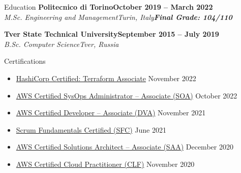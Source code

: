 \documentclass[a4paper]{article}
\newlength{\tabin}
\newlength{\secsep}
\newcommand{\lineunder}{\vspace*{-8pt}\\\hspace*{-6pt}\hrulefill\\\vspace*{-15pt}}
\newcommand{\education}[4]{\vspace{\secsep}\textbf{#1\hfill#2}\\\textit{#3\hfill#4}\vspace{2\secsep}}
\newcommand{\educationwithgrade}[5]{\vspace{\secsep}\textbf{#1\hfill#2}\\\textit{#3\hfill#4}\linebreak\textbf{\textit{#5}}\vspace{2\secsep}}
\newenvironment{tabbedsection}[1]{
  \begin{list}{}{
    \setlength{\itemsep}{0pt}
    \setlength{\labelsep}{0pt}
    \setlength{\labelwidth}{0pt}
    \setlength{\leftmargin}{\tabin}
    \setlength{\rightmargin}{\tabin}
    \setlength{\listparindent}{0pt}
    \setlength{\parsep}{0pt}
    \setlength{\parskip}{0pt}
    \setlength{\partopsep}{0pt}
    \setlength{\topsep}{#1}
  }
  \item[]
}{\end{list}}
\newenvironment{resume_section}[1]{
  \filbreak
  \vspace{2\secsep}
  \textsc{\large#1}
  \lineunder
  \begin{tabbedsection}{\secsep}
}{\end{tabbedsection}}
\newenvironment{subitems}{
  \renewcommand{\labelitemi}{-}
  \begin{itemize}
  \setlength{\labelsep}{1em}
}{\end{itemize}}
\begin{document}
\begin{resume_section}{Education}
  \educationwithgrade{Politecnico di Torino}{October 2019 -- March 2022}{M.Sc. Engineering and Management}{Turin, Italy}{Final Grade: 104/110}

  \education{Tver State Technical University}{September 2015 -- July 2019}{B.Sc. Computer Science}{Tver, Russia}
\end{resume_section}

\begin{resume_section}{Certifications}
  \begin{subitems}
    \item \href{https://www.credly.com/badges/26043bb9-cca6-4c6c-80ae-51a4ef85da84}{HashiCorp Certified: Terraform Associate} \hfill November 2022
    \item \href{https://www.credly.com/badges/849a2bb2-2a38-46ad-9352-613da643d83a}{AWS Certified SysOps Administrator -- Associate (SOA)} \hfill October 2022
    \item \href{https://www.credly.com/badges/4af15df4-f5b2-4d6b-b989-bb47e71c9986}{AWS Certified Developer -- Associate (DVA)} \hfill November 2021
    \item \href{https://www.scrumstudy.com/certification/verify?type=SFC&number=848920}{Scrum Fundamentals Certified (SFC)} \hfill June 2021
    \item \href{https://www.credly.com/badges/52a6f0ff-d46a-4d42-9bb1-ea2b7fb01526}{AWS Certified Solutions Architect -- Associate (SAA)} \hfill December 2020
    \item \href{https://www.credly.com/badges/488ba1a8-a95a-46f5-943b-c275bc7e6178}{AWS Certified Cloud Practitioner (CLF)} \hfill November 2020
  \end{subitems}
\end{resume_section}
\end{document}
